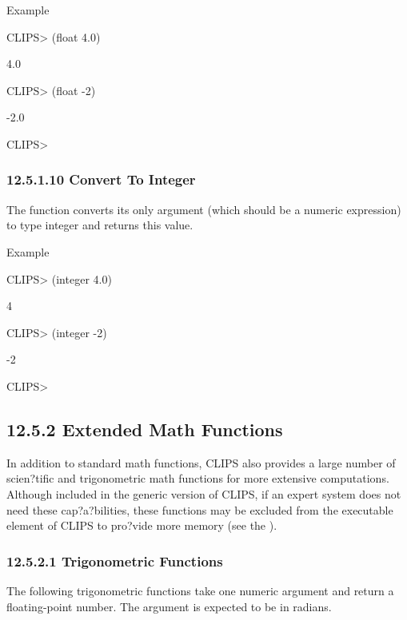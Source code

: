 \documentclass[letterpaper,10pt,english]{sphinxmanual}
\begin{document}
Example

CLIPS\textgreater{} (float 4.0)

4.0

CLIPS\textgreater{} (float -2)

-2.0

CLIPS\textgreater{}


\subsubsection{12.5.1.10 Convert To Integer}
\label{\detokenize{actions:convert-to-integer}}
The  function converts its only argument (which should be a
numeric expression) to type integer and returns this value.


\begin{sphinxVerbatim}[commandchars=\\\{\}]
 
\end{sphinxVerbatim}

Example

CLIPS\textgreater{} (integer 4.0)

4

CLIPS\textgreater{} (integer -2)

-2

CLIPS\textgreater{}


\subsection{12.5.2 Extended Math Functions}
\label{\detokenize{actions:extended-math-functions}}
In addition to standard math functions, CLIPS also provides a large
number of scien?tific and trigonometric math functions for more
extensive computations. Although included in the generic version of
CLIPS, if an expert system does not need these cap?a?bilities, these
functions may be excluded from the executable element of CLIPS to
pro?vide more memory (see the ).


\subsubsection{12.5.2.1 Trigonometric Functions}
\label{\detokenize{actions:trigonometric-functions}}
The following trigonometric functions take one numeric argument and
return a floating-point number. The argument is expected to be in
radians.
\end{document}
